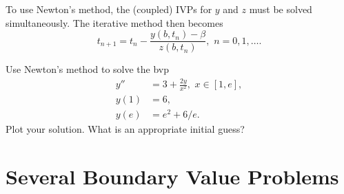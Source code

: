 To use Newton's method, the (coupled) IVPs for $y$ and $z$ must be solved simultaneously. The iterative method then becomes 
\[
t_{n+1} = t_n - \frac{ y(b,t_n) - \beta}{z(b,t_n)}, \,\, n = 0,1,\hdots
.\]
% 
% 	
% 	
% 		
% 



\begin{problem}
Use Newton's method to solve the bvp
\begin{equation*}
\begin{split}
y'' &= 3 + \frac{2y}{x^2}, \,\, x \in [1,e],\\
y(1) &= 6, \\
y(e) &= e^2 + 6/e.
\end{split}
\end{equation*}
Plot your solution. What is an appropriate initial guess? 
\end{problem}

\section{Several Boundary Value Problems}

